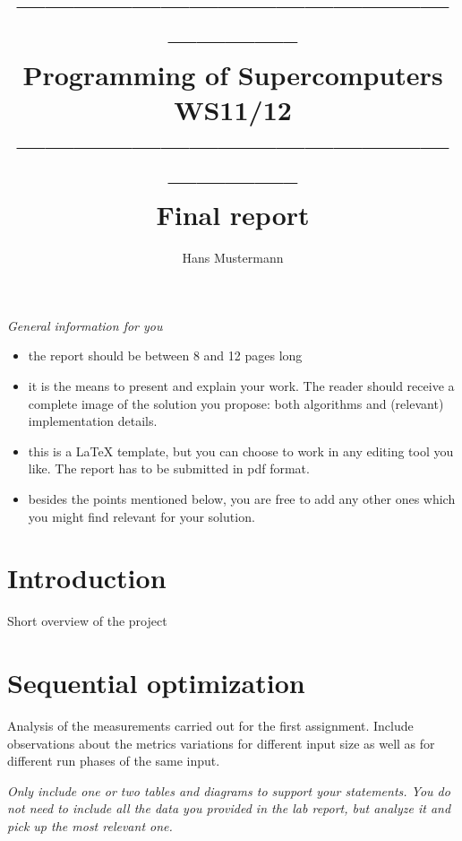 \documentclass[12pt, a4paper]{article}
\title{----------------------------------------------------------- \\
        {\bf Programming of Supercomputers WS11/12}\\ 
        ----------------------------------------------------------- \\ 
        Final report}
\author{Hans Mustermann}
\date{ }
\newcommand{\draft}[1]{\textcolor{NavyBlue}{#1}}
\newcommand{\hint}[1]{\textcolor{OliveGreen}{{\it#1}}}
\begin{document}
  \maketitle

\hint{General information for you
\begin{itemize}
	\item the report should be between 8 and 12 pages long
	\item it is the means to present and explain your work. The reader should receive a complete image of the solution you propose: both algorithms and  (relevant) implementation details.
	\item this is a LaTeX template, but you can choose to work in any editing tool you like. The report has to be submitted in pdf format.
	\item besides the points mentioned below, you are free to add any other ones which you might find relevant for your solution.
\end{itemize}}

\section{Introduction}
\draft{Short overview of the project}

\section{Sequential optimization}
\draft{Analysis of the measurements carried out for the first assignment. Include observations about the metrics variations for different input size as well as for different run phases of the same input.}

\hint{Only include one or two tables and diagrams to support your statements. You do not need to include all the data you provided in the lab report, but analyze it and pick up the most relevant one.}
\end{document}
